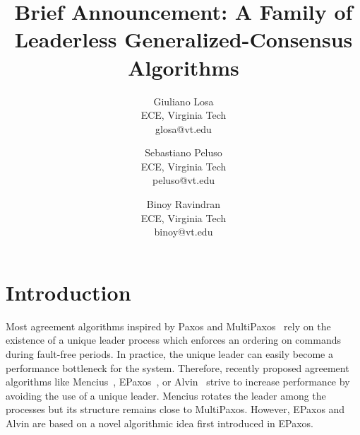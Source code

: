 

\title{\vspace{-0.8in}Brief Announcement: A Family of Leaderless Generalized-Consensus Algorithms}

\begin{comment}
\author{
{\small Author 1}\\
{\small ECE, Virginia Tech}\\
{\small email}
\and
{\small Author 2}\\
{\small ECE, Virginia Tech}\\
{\small email}
\and
{\small Author 3}\\
{\small ECE, Virginia Tech}\\
{\small email}
}
\end{comment}


\author{
Giuliano Losa\\
ECE, Virginia Tech\\
glosa@vt.edu
\and
Sebastiano Peluso\\
ECE, Virginia Tech\\
peluso@vt.edu
\and
Binoy Ravindran\\
ECE, Virginia Tech\\
binoy@vt.edu
}

\date{}



\maketitle

%

\vspace{-0.5cm}
\section{Introduction}

Most agreement algorithms inspired by Paxos and MultiPaxos~\cite{lamport2001paxos} rely on the existence of a unique leader process which enforces an ordering on commands during fault-free periods.
In practice, the unique leader can easily become a performance bottleneck for the system.
Therefore, recently proposed agreement algorithms like Mencius~\cite{MaoJunqueiraMarzullo08MenciusBuildingEfficientReplicatedStateMachine}, EPaxos~\cite{MoraruAndersenKaminsky13ThereIsMoreConsensusEgalitarianParliaments}, or Alvin~\cite{TurcuETAL14BeGeneralDontGiveUpConsistency} strive to increase performance by avoiding the use of a unique leader.
Mencius rotates the leader among the processes but its structure remains close to MultiPaxos. 
However, EPaxos and Alvin are based on a novel algorithmic idea first introduced in EPaxos.


